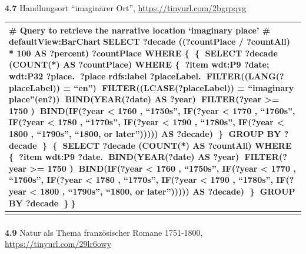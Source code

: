 \documentclass[
  12pt,
  letterpaper,
  DIV=11,
  numbers=noendperiod]{scrreprt}
\makeatletter
\let\oldparagraph\paragraph
\renewcommand{\paragraph}{
    \@ifstar
      \xxxParagraphStar
      \xxxParagraphNoStar
  }
\newcommand{\xxxParagraphStar}[1]{\oldparagraph*{#1}\mbox{}}
\newcommand{\xxxParagraphNoStar}[1]{\oldparagraph{#1}\mbox{}}
\makeatother
\begin{document}
\paragraph{\texorpdfstring{\textbf{4.7} Handlungsort ``imaginärer Ort'',
\url{https://tinyurl.com/2bgrpqvg}}{4.7 Handlungsort ``imaginärer Ort'', https://tinyurl.com/2bgrpqvg}}\label{handlungsort-imaginuxe4rer-ort-httpstinyurl.com2bgrpqvg}

\begin{longtable}[]{@{}
  >{\raggedright\arraybackslash}p{}@{}}
\toprule\noalign{}
\begin{minipage}[b]{\linewidth}\raggedright
\# Query to retrieve the narrative location `imaginary place' \#
defaultView:BarChartSELECT ?decade ((?countPlace / ?countAll) * 100 AS
?percent) ?countPlace WHERE \{ \{ SELECT ?decade (COUNT(*) AS
?countPlace) WHERE \{ ?item wdt:P9 ?date; wdt:P32 ?place. ?place
rdfs:label ?placeLabel. FILTER((LANG(?placeLabel)) = ``en'')
FILTER((LCASE(?placeLabel)) = ``imaginary place''(\textbf{en?}))
BIND(YEAR(?date) AS ?year) FILTER(?year \textgreater= 1750 )
BIND(IF(?year \textless{} 1760 , ``1750s'', IF(?year \textless{} 1770 ,
``1760s'', IF(?year \textless{} 1780 , ``1770s'', IF(?year \textless{}
1790 , ``1780s'', IF(?year \textless{} 1800 , ``1790s'', ``1800, or
later''))))) AS ?decade) \} GROUP BY ?decade \} \{ SELECT ?decade
(COUNT(*) AS ?countAll) WHERE \{ ?item wdt:P9 ?date. BIND(YEAR(?date) AS
?year) FILTER(?year \textgreater= 1750 ) BIND(IF(?year \textless{} 1760
, ``1750s'', IF(?year \textless{} 1770 , ``1760s'', IF(?year \textless{}
1780 , ``1770s'', IF(?year \textless{} 1790 , ``1780s'', IF(?year
\textless{} 1800 , ``1790s'', ``1800, or later''))))) AS ?decade) \}
GROUP BY ?decade \}\}
\end{minipage} \\
\midrule\noalign{}
\endhead
\bottomrule\noalign{}
\endlastfoot
\end{longtable}

\paragraph{\texorpdfstring{\textbf{4.9} Natur als Thema französischer
Romane 1751-1800,
\url{https://tinyurl.com/29lr6owy}}{4.9 Natur als Thema französischer Romane 1751-1800, https://tinyurl.com/29lr6owy}}\label{natur-als-thema-franzuxf6sischer-romane-1751-1800-httpstinyurl.com29lr6owy}
\end{document}
